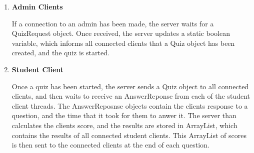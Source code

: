 \begin{enumerate}
	\item \textbf{Admin Clients}

	If a connection to an admin has been made, the server waits for a
	QuizRequest object. Once received, the server updates a static boolean
	variable, which informs all connected clients that a Quiz object has been
	created, and the quiz is started.

	\item \textbf{Student Client}

	Once a quiz has been started, the server sends a Quiz object to all
	connected clients, and then waits to receive an AnswerReponse from each of
	the student client threads. The AnswerReposnse objects contain the clients
	response to a question, and the time that it took for them to anwer it.
	The server than calculates the clients score, and the results are stored
	in ArrayList, which contains the results of all connected student clients.
	This ArrayList of scores is then sent to the connected clients at the end
	of each question.
\end{enumerate}
